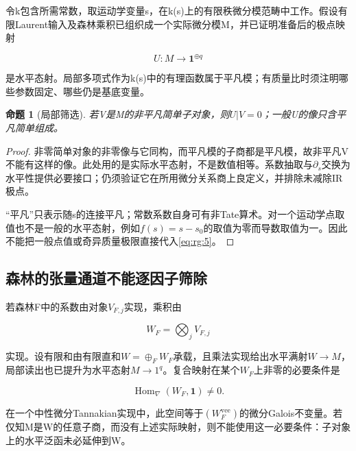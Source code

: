 \documentclass[11pt,a4paper,oneside]{ctexrep}
\theoremstyle{cnplain}
\newtheorem{proposition}[theorem]{命题}
\theoremstyle{definition}
\theoremstyle{remark}
\begin{document}
令k包含所需常数，取运动学变量s，在k(s)上的有限秩微分模范畴中工作。假设有限Laurent输入及森林乘积已组织成一个实际微分模M，并已证明准备后的极点映射

\begin{equation}
U:M\longrightarrow\mathbf1^{\oplus q}             \label{eq:rg:5}
\end{equation}

是水平态射。局部多项式作为k(s)中的有理函数属于平凡模；有质量比时须注明哪些参数固定、哪些仍是基底变量。

\begin{proposition}[局部筛选]

\label{thm:rg:3.1} 若V是M的非平凡简单子对象，则\(U|V=0\)；一般U的像只含平凡简单组成。

\end{proposition}

\begin{proof}

非零简单对象的非零像与它同构，而平凡模的子商都是平凡模，故非平凡V不能有这样的像。此处用的是实际水平态射，不是数值相等。系数抽取与\(\partial _s\)交换为水平性提供必要接口；仍须验证它在所用微分关系商上良定义，并排除未减除IR极点。

``平凡''只表示随s的连接平凡；常数系数自身可有非Tate算术。对一个运动学点取值也不是一般的水平态射，例如\(f(s)=s-s_0\)的取值为零而导数取值为一。因此不能把一般点值或奇异质量极限直接代入\eqref{eq:rg:5}。

\end{proof}

\subsection{森林的张量通道不能逐因子筛除}\label{sec:rg:3.2}

若森林F中的系数由对象\(V_{F,j}\)实现，乘积由

\begin{equation}
W_F=\bigotimes_j V_{F,j}
\end{equation}

实现。设有限和由有限直和\(W=\oplus _F W_F\)承载，且乘法实现给出水平满射\(W\to M\)，局部读出也已提升为水平态射\(M\to 1^q\)。复合映射在某个\(W_F\)上非零的必要条件是

\begin{equation}
\operatorname{Hom}_{\nabla}(W_F,\mathbf1)\ne0.     \label{eq:rg:6}
\end{equation}

在一个中性微分Tannakian实现中，此空间等于\((W_F^{\mathrm{vee}})\)的微分Galois不变量。若仅知M是W的任意子商，而没有上述实际映射，则不能使用这一必要条件：子对象上的水平泛函未必延伸到W。
\end{document}
